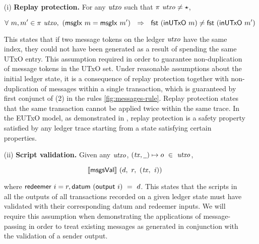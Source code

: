 \begin{itemize}
  \item[(i)] \textbf{Replay protection. }
  For any $\mathit{utxo}$ such that $\pi~\mathit{utxo} \neq \star$,

  \[ \forall ~m, m' \in \pi~\mathit{utxo}, ~(\mathsf{msgIx}~m = \mathsf{msgIx}~m')~~\Rightarrow~~\mathsf{fst}~(\mathsf{inUTxO}~m) \neq \mathsf{fst}~(\mathsf{inUTxO}~m') \]

  This states that if two message tokens on the ledger $\mathit{utxo}$ have the
  same index, they could not have been generated as a result of spending the
  same UTxO entry. This assumption required in
  order to guarantee non-duplication of message tokens in the UTxO set.
  Under reasonable assumptions about the initial ledger state, it is a consequence
  of replay protection together with non-duplication of messages within a single transaction,
  which is guaranteed by first conjunct of (2) in the rules \ref{fig:messages-rule}.
  Replay protection states that the same transaction cannot be applied twice within the same trace.
  In the EUTxO model, as demonstrated in \cite{eutxoma} \cite{agdaspeceutxo},
  replay protection is a safety property satisfied by any
  ledger trace starting from a state satisfying certain properties.

  \item[(ii)] \textbf{Script validation. }
  Given any $\mathit{utxo}$, $(\var{tx}, \wcard) \mapsto o~\in~\var{utxo}$,

  \[ \llbracket\mathsf{msgsVal}\rrbracket~(d,~r,~(\mathit{tx},~\mathit{i})) \]

  where $\mathsf{redeemer}~i = r, \mathsf{datum}~(\mathsf{output}~i)~=~d$.
  This states that the scripts in all the outputs of all transactions recorded on
  a given ledger state must have validated with their corresponding datum and
  redeemer inputs. We will require this assumption when demonstrating the
  applications of message-passing in order to treat existing messages as
  generated in conjunction with the validation of a sender output.

\end{itemize}
